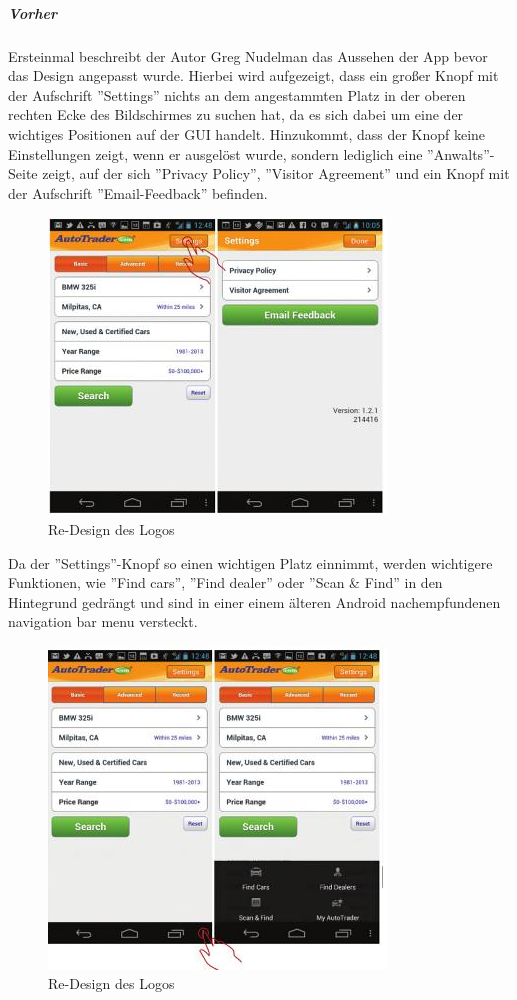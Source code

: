 \subparagraph{Vorher}
\label{subp:vorher}
Ersteinmal beschreibt der Autor Greg Nudelman das Aussehen der App bevor das Design angepasst wurde. Hierbei wird aufgezeigt, dass ein großer Knopf mit der Aufschrift ''Settings'' nichts an dem angestammten Platz in der oberen rechten Ecke des Bildschirmes zu suchen hat, da es sich dabei um eine der wichtiges Positionen auf der GUI handelt. Hinzukommt, dass der Knopf keine Einstellungen zeigt, wenn er ausgelöst wurde, sondern lediglich eine ''Anwalts''-Seite zeigt, auf der sich ''Privacy Policy'', ''Visitor Agreement'' und ein Knopf mit der Aufschrift ''Email-Feedback'' befinden.\cite{AndroidDesignPatterns}\\

\begin{figure}[h]
 \centering
 \includegraphics[height=0.40\textheight]{img/Design1.png}
 \caption{Re-Design des Logos}
\end{figure}

Da der ''Settings''-Knopf so einen wichtigen Platz einnimmt, werden wichtigere Funktionen, wie ''Find cars'', ''Find dealer'' oder ''Scan \& Find'' in den Hintegrund gedrängt und sind in einer einem älteren Android nachempfundenen navigation bar menu versteckt.

\begin{figure}[h]
 \centering
 \includegraphics[height=0.40\textheight]{img/Design2.png}
 \caption{Re-Design des Logos}
\end{figure}

